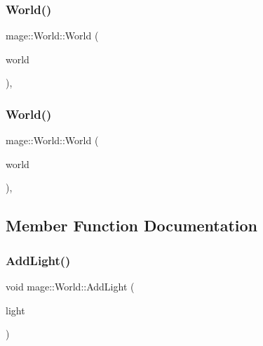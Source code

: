 \hypertarget{classmage_1_1_world_a28e20e33499cd57282cefa5ab0fda041}{}\label{classmage_1_1_world_a28e20e33499cd57282cefa5ab0fda041} 
\subsubsection{\texorpdfstring{World()}{World()}\hspace{0.1cm}{\footnotesize\ttfamily [2/3]}}
{\footnotesize\ttfamily mage\+::\+World\+::\+World (\begin{DoxyParamCaption}\item[{const \hyperlink{classmage_1_1_world}{World} \&}]{world }\end{DoxyParamCaption})\hspace{0.3cm}{\ttfamily [private]}, {\ttfamily [delete]}}

\hypertarget{classmage_1_1_world_a29c5740a1fc3bfd7f05c6692257d17ff}{}\label{classmage_1_1_world_a29c5740a1fc3bfd7f05c6692257d17ff} 
\subsubsection{\texorpdfstring{World()}{World()}\hspace{0.1cm}{\footnotesize\ttfamily [3/3]}}
{\footnotesize\ttfamily mage\+::\+World\+::\+World (\begin{DoxyParamCaption}\item[{\hyperlink{classmage_1_1_world}{World} \&\&}]{world }\end{DoxyParamCaption})\hspace{0.3cm}{\ttfamily [private]}, {\ttfamily [delete]}}



\subsection{Member Function Documentation}
\hypertarget{classmage_1_1_world_ab0c31d3113ea264fed8b8ef034047c91}{}\label{classmage_1_1_world_ab0c31d3113ea264fed8b8ef034047c91} 
\subsubsection{\texorpdfstring{Add\+Light()}{AddLight()}}
{\footnotesize\ttfamily void mage\+::\+World\+::\+Add\+Light (\begin{DoxyParamCaption}\item[{\hyperlink{namespacemage_a1e01ae66713838a7a67d30e44c67703e}{Shared\+Ptr}$<$ \hyperlink{classmage_1_1_point_light}{Point\+Light} $>$}]{light }\end{DoxyParamCaption})}


